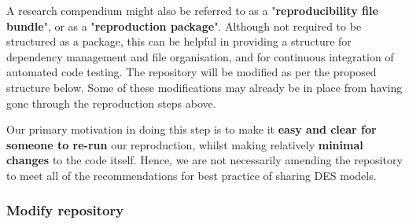 A research compendium might also be referred to as a "\textbf{reproducibility file bundle}",\autocite{arguillas_10_2022} or as a "\textbf{reproduction package}".\autocite{krafczyk_learning_2021} Although not required to be structured as a package, this can be helpful in providing a structure for dependency management and file organisation, and for continuous integration of automated code testing.\autocite{marwick_packaging_2018} The repository will be modified as per the proposed structure below. Some of these modifications may already be in place from having gone through the reproduction steps above.

Our primary motivation in doing this step is to make it \textbf{easy and clear for someone to re-run} our reproduction, whilst making relatively \textbf{minimal changes} to the code itself. Hence, we are not necessarily amending the repository to meet all of the recommendations for best practice of sharing DES models.

\vspace{0.5cm}
\subsubsection{Modify repository}

